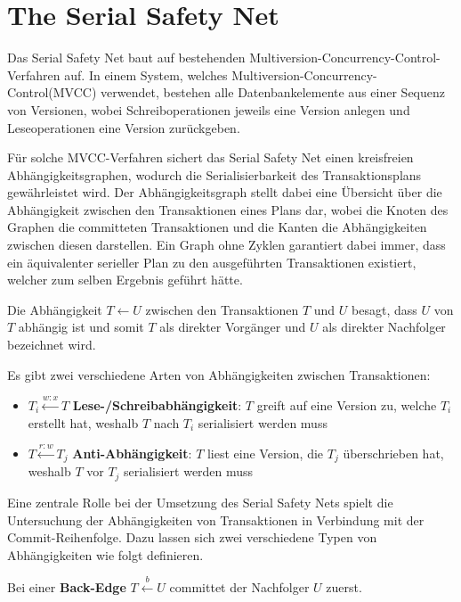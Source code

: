 \section{The Serial Safety Net}
\label{sec:ssn}

Das Serial Safety Net baut auf bestehenden Multiversion-Concurrency-Control-Verfahren auf.
In einem System, welches Multiversion-Concurrency-Control(MVCC) verwendet, bestehen alle Datenbankelemente aus einer Sequenz von Versionen, wobei Schreiboperationen jeweils eine Version anlegen und Leseoperationen eine Version zurückgeben.

Für solche MVCC-Verfahren sichert das Serial Safety Net einen kreisfreien Abhängigkeitsgraphen, wodurch die Serialisierbarkeit des Transaktionsplans gewährleistet wird.
Der Abhängigkeitsgraph stellt dabei eine Übersicht über die Abhängigkeit zwischen den Transaktionen eines Plans dar, wobei die Knoten des Graphen die committeten Transaktionen und die Kanten die Abhängigkeiten zwischen diesen darstellen.
Ein Graph ohne Zyklen garantiert dabei immer, dass ein äquivalenter serieller Plan zu den ausgeführten Transaktionen existiert, welcher zum selben Ergebnis geführt hätte.

\begin{Definition}
	Die Abhängigkeit $T\leftarrow U$ zwischen den Transaktionen $T$ und $U$ besagt, dass $U$ von $T$ abhängig ist und somit $T$ als direkter Vorgänger und $U$ als direkter Nachfolger bezeichnet wird.
\end{Definition}

Es gibt zwei verschiedene Arten von Abhängigkeiten zwischen Transaktionen:
\begin{itemize}
	\item $T_i\xleftarrow{w:x}T$ \textbf{Lese-/Schreibabhängigkeit}: $T$ greift auf eine Version zu, welche $T_i$ erstellt hat, weshalb $T$ nach $T_i$ serialisiert werden muss
	\item $T\xleftarrow{r:w}T_j$ \textbf{Anti-Abhängigkeit}: $T$ liest eine Version, die $T_j$ überschrieben hat, weshalb $T$ vor $T_j$ serialisiert werden muss
\end{itemize}

Eine zentrale Rolle bei der Umsetzung des Serial Safety Nets spielt die Untersuchung der Abhängigkeiten von Transaktionen in Verbindung mit der Commit-Reihenfolge.
Dazu lassen sich zwei verschiedene Typen von Abhängigkeiten wie folgt definieren.

\begin{Definition}
	Bei einer \textcolor{my-green}{\textbf{Back-Edge}} $T\xleftarrow{b} U$ committet der Nachfolger $U$ zuerst.
\end{Definition}

